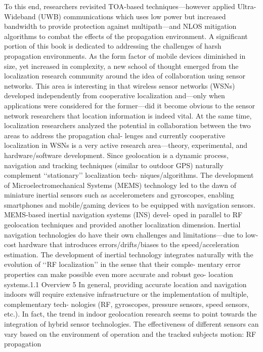 To this end, researchers revisited TOA-based techniques—however applied Ultra-
Wideband (UWB) communications which uses low power but increased bandwidth
to provide protection against multipath—and NLOS mitigation algorithms to
combat the effects of the propagation environment. A significant portion of this book
is dedicated to addressing the challenges of harsh propagation environments.
As the form factor of mobile devices diminished in size, yet increased in
complexity, a new school of thought emerged from the localization research
community around the idea of collaboration using sensor networks. This area is
interesting in that wireless sensor networks (WSNs) developed independently from
cooperative localization and—only when applications were considered for the
former—did it become obvious to the sensor network researchers that location
information is indeed vital. At the same time, localization researchers analyzed the
potential in collaboration between the two areas to address the propagation chal-
lenges and currently cooperative localization in WSNs is a very active research
area—theory, experimental, and hardware/software development.
Since geolocation is a dynamic process, navigation and tracking techniques
(similar to outdoor GPS) naturally complement ‘‘stationary’’ localization tech-
niques/algorithms. The development of Microelectromechanical Systems (MEMS)
technology led to the dawn of miniature inertial sensors such as accelerometers
and gyroscopes, enabling smartphones and mobile/gaming devices to be equipped
with navigation sensors. MEMS-based inertial navigation systems (INS) devel-
oped in parallel to RF geolocation techniques and provided another localization
dimension. Inertial navigation technologies do have their own challenges and
limitations—due to low-cost hardware that introduces errors/drifts/biases to the
speed/acceleration estimation. The development of inertial technology integrates
naturally with the evolution of ‘‘RF localization’’ in the sense that their comple-
mentary error properties can make possible even more accurate and robust geo-
location systems.1.1 Overview
5
In general, providing accurate location and navigation indoors will require
extensive infrastructure or the implementation of multiple, complementary tech-
nologies (RF, gyroscopes, pressure sensors, speed sensors, etc.). In fact, the trend
in indoor geolocation research seems to point towards the integration of hybrid
sensor technologies. The effectiveness of different sensors can vary based on the
environment of operation and the tracked subjects motion: RF propagation
